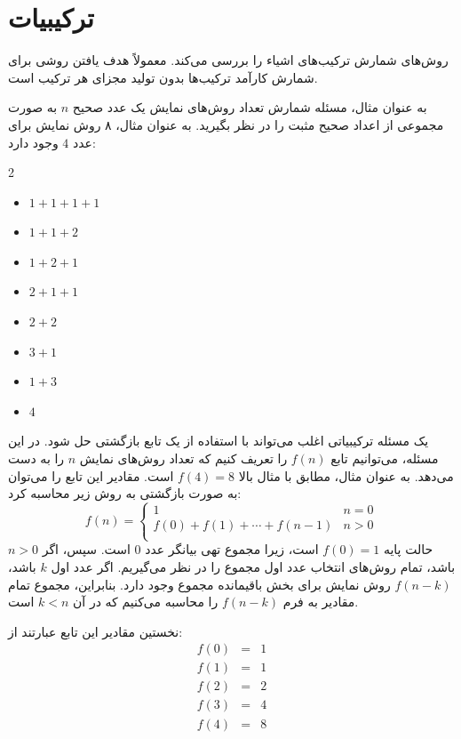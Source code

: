 \chapter{ترکیبیات}


 روش‌های شمارش ترکیب‌های اشیاء را بررسی می‌کند.
معمولاً هدف یافتن روشی برای شمارش کارآمد ترکیب‌ها
بدون تولید مجزای هر ترکیب است.

به عنوان مثال، مسئله شمارش تعداد روش‌های نمایش
یک عدد صحیح $n$ به صورت مجموعی از اعداد صحیح مثبت را در نظر بگیرید.
به عنوان مثال، ۸ روش نمایش برای عدد $4$ وجود دارد:
\begin{multicols}{2}
\begin{itemize}
\item $1+1+1+1$
\item $1+1+2$
\item $1+2+1$
\item $2+1+1$
\item $2+2$
\item $3+1$
\item $1+3$
\item $4$
\end{itemize}
\end{multicols}

یک مسئله ترکیبیاتی اغلب می‌تواند با استفاده از یک تابع بازگشتی حل شود.
در این مسئله، می‌توانیم تابع $f(n)$ را تعریف کنیم
که تعداد روش‌های نمایش $n$ را به دست می‌دهد.
به عنوان مثال، مطابق با مثال بالا $f(4)=8$ است.
مقادیر این تابع را می‌توان به صورت بازگشتی به روش زیر محاسبه کرد:
\begin{equation*}
    f(n) = \begin{cases}
               1               & n = 0\\
               f(0)+f(1)+\cdots+f(n-1) & n > 0\\
           \end{cases}
\end{equation*}
حالت پایه $f(0)=1$ است،
زیرا مجموع تهی بیانگر عدد 0 است.
سپس، اگر $n>0$ باشد، تمام روش‌های انتخاب عدد اول مجموع را در نظر می‌گیریم.
اگر عدد اول $k$ باشد،
$f(n-k)$ روش نمایش برای بخش باقیمانده مجموع وجود دارد.
بنابراین، مجموع تمام مقادیر به فرم $f(n-k)$ را محاسبه می‌کنیم که در آن $k<n$ است.

نخستین مقادیر این تابع عبارتند از:
\[
\begin{array}{lcl}
f(0) & = & 1 \\
f(1) & = & 1 \\
f(2) & = & 2 \\
f(3) & = & 4 \\
f(4) & = & 8 \\
\end{array}
\]

